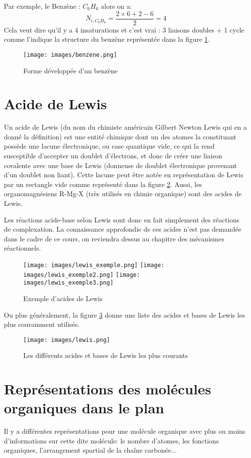 \documentclass[a4paper, oneside]{book}
\begin{document}
Par exemple, le Benzène : $C_6H_6$ alors on a:
\begin{equation}
    N_{i,C_6H_6}=\frac{2\times6+2-6}{2}=4
\end{equation}
Cela veut dire qu'il y a 4 insaturations et c'est vrai : 3 liaisons doubles + 1 cycle comme l'indique la structure du benzène représentée dans la figure \ref{fig:benzene_dev}. 
\begin{figure}[!h]
    \centering
    \texttt{[image: images/benzene.png]}
    \caption{Forme développée d'un benzène}
    \label{fig:benzene_dev}
\end{figure}
\section{Acide de Lewis}
Un acide de Lewis (du nom du chimiste américain Gilbert Newton Lewis qui en a donné la définition) est une entité chimique dont un des atomes la constituant possède une lacune électronique, ou case quantique vide, ce qui la rend susceptible d'accepter un doublet d'électrons, et donc de créer une liaison covalente avec une base de Lewis (donneuse de doublet électronique provenant d'un doublet non liant). Cette lacune peut être notée en représentation de Lewis par un rectangle vide comme représenté dans la figure \ref{fig:lexis_example}. Aussi, les organomagnésiens R-Mg-X (très utilisés en chimie organique) sont des acides de Lewis.

Les réactions acide-base selon Lewis sont donc en fait simplement des réactions de complexation. La connaissance approfondie de ces acides n'est pas demandée dans le cadre de ce cours, on reviendra dessus au chapitre des mécanismes réactionnels.

\begin{figure}[!h]
    \centering
    \texttt{[image: images/lewis\_exemple.png]}
    \texttt{[image: images/lewis\_exemple2.png]}
    \texttt{[image: images/lewis\_exemple3.png]}
    \caption{Exemple d'acides de Lewis}
    \label{fig:lexis_example}
\end{figure}

Ou plus généralement, la figure \ref{fig:lewis_list} donne une liste des acides et bases de Lewis les plus couramment utilisés. 
\begin{figure}[!h]
    \centering
    \texttt{[image: images/lewis.png]} 
    \caption{Les différents acides et bases de Lewis les plus courants}
    \label{fig:lewis_list}
\end{figure}
\section{Représentations des molécules organiques dans le plan}
Il y a différentes représentations pour une molécule organique avec plus ou moins d'informations sur cette dite molécule: le nombre d'atomes, les fonctions organiques, l'arrangement spartial de la chaîne carbonée...
\end{document}
